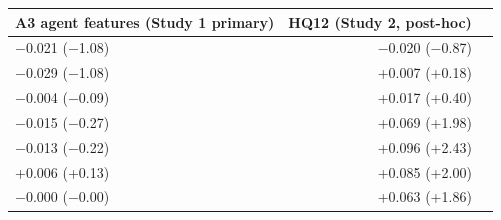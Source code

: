 \begin{tabular}{lrr}
\toprule
A3 agent features (Study 1 primary) & HQ12 (Study 2, post-hoc) \\
\midrule
$-$0.021 ($-$1.08) & $-$0.020 ($-$0.87) \\
$-$0.029 ($-$1.08) & +0.007 (+0.18) \\
$-$0.004 ($-$0.09) & +0.017 (+0.40) \\
$-$0.015 ($-$0.27) & +0.069 (+1.98) \\
$-$0.013 ($-$0.22) & +0.096 (+2.43) \\
+0.006 (+0.13) & +0.085 (+2.00) \\
$-$0.000 ($-$0.00) & +0.063 (+1.86) \\
\bottomrule
\end{tabular}
